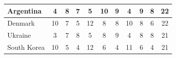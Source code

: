\documentclass[12pt]{article}  %
\begin{document}
\begin{subappendices}
\begin{longtable}{|l|c|c|c|c|c|c|c|c|c|c|}
	\hline
	Argentina                                                      & 4                                                                      & 8                                                                      & 7                                                                      & 5                                                                      & 10                                                                     & 9                                                                      & 4                         & 9                           & 8                           & 22                          \\ 
	\hline
	Denmark                                                        & 10                                                                     & 7                                                                      & 5                                                                      & 12                                                                     & 8                                                                      & 8                                                                      & 10                        & 8                           & 6                           & 22                          \\ 
	\hline
	Ukraine                                                        & 3                                                                      & 7                                                                      & 8                                                                      & 5                                                                      & 8                                                                      & 9                                                                      & 4                         & 8                           & 8                           & 21                          \\ 
	\hline
	South Korea                                                    & 10                                                                     & 5                                                                      & 4                                                                      & 12                                                                     & 6                                                                      & 4                                                                      & 11                        & 6                           & 4                           & 21                          \\ 

\end{longtable}
\end{subappendices}
\end{document}
